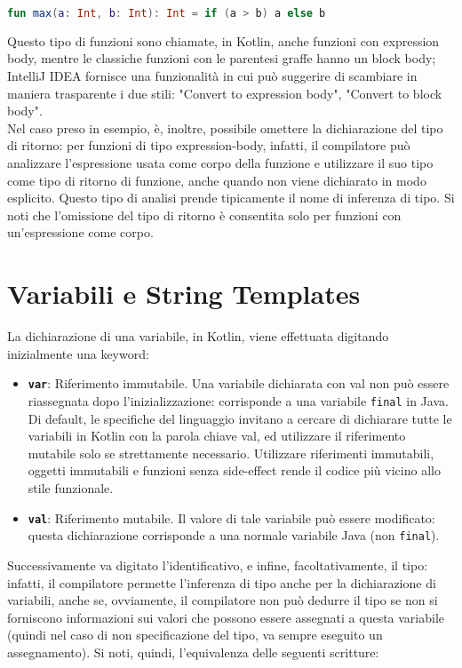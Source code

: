 \begin{lstlisting}[caption={Inline-function}, captionpos=b, label={lst:exampleInlineFunction}, language=Kotlin]
fun max(a: Int, b: Int): Int = if (a > b) a else b
\end{lstlisting}

Questo tipo di funzioni sono chiamate, in Kotlin, anche funzioni con expression body, mentre le classiche funzioni con le parentesi graffe hanno un block body; IntelliJ IDEA fornisce una funzionalità in cui può suggerire di scambiare in maniera trasparente i due stili: "Convert to expression body", "Convert to block body".\\

Nel caso preso in esempio, è, inoltre, possibile omettere la dichiarazione del tipo di ritorno:
per funzioni di tipo expression-body, infatti, il compilatore può analizzare l'espressione usata come corpo della funzione e utilizzare il suo tipo come tipo di ritorno di funzione, anche quando non viene dichiarato in modo esplicito. Questo tipo di analisi prende tipicamente il nome di inferenza di tipo. Si noti che l'omissione del tipo di ritorno è consentita solo per funzioni con un'espressione come corpo.\\

\section{Variabili e String Templates}
La dichiarazione di una variabile, in Kotlin, viene effettuata digitando inizialmente una keyword:
\begin{itemize}
  \item {\bfseries\texttt{var}}: Riferimento immutabile. Una variabile dichiarata con val non può essere
  riassegnata dopo l'inizializzazione: corrisponde a una variabile \texttt{final} in Java. Di default, le specifiche del linguaggio invitano a cercare di dichiarare tutte le variabili in Kotlin con la parola chiave val, ed utilizzare il riferimento mutabile solo se strettamente necessario. Utilizzare riferimenti immutabili, oggetti immutabili e funzioni senza side-effect rende il codice più vicino allo stile funzionale.
  \item {\bfseries\texttt{val}}: Riferimento mutabile. Il valore di tale variabile può essere modificato: questa dichiarazione corrisponde a una normale variabile Java (non \texttt{final}).
\end{itemize}

Successivamente va digitato l’identificativo, e infine, facoltativamente, il tipo: infatti, il compilatore permette l’inferenza di tipo anche per la dichiarazione di variabili, anche se, ovviamente, il compilatore non può dedurre il tipo se non si forniscono informazioni sui valori che possono
essere assegnati a questa variabile (quindi nel caso di non specificazione del tipo, va sempre eseguito un assegnamento). Si noti, quindi, l’equivalenza delle seguenti scritture:

